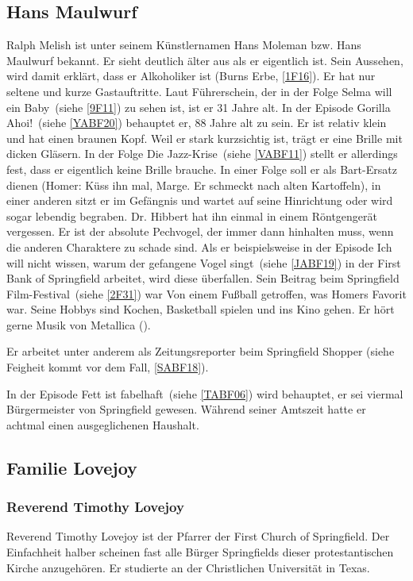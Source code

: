 {\subsection{Hans Maulwurf}\label{HansMaulwurf}
Ralph Melish ist unter seinem Künstlernamen Hans Moleman bzw. Hans Maulwurf bekannt. Er sieht deutlich älter aus als er eigentlich ist. Sein Aussehen, wird damit erklärt, dass er Alkoholiker ist (\glqq Burns Erbe\grqq , \ref{1F16}). Er hat nur seltene und kurze Gastauftritte. Laut Führerschein, der in der Folge \glqq Selma will ein Baby\grqq\ (siehe \ref{9F11}) zu sehen ist, ist er 31 Jahre alt. In der Episode \glqq Gorilla Ahoi!\grqq\ (siehe \ref{YABF20}) behauptet er, 88 Jahre alt zu sein. Er ist relativ klein und hat einen braunen Kopf. Weil er stark kurzsichtig ist, trägt er eine Brille mit dicken Gläsern. In der Folge \glqq Die Jazz-Krise\grqq\ (siehe \ref{VABF11}) stellt er allerdings fest, dass er eigentlich keine Brille brauche. In einer Folge soll er als Bart-Ersatz dienen (Homer: \glqq Küss ihn mal, Marge. Er schmeckt nach alten Kartoffeln\grqq ), in einer anderen sitzt er im Gefängnis und wartet auf seine Hinrichtung oder wird sogar lebendig begraben. Dr. Hibbert hat ihn einmal in einem Röntgengerät vergessen. Er ist der absolute Pechvogel, der immer dann hinhalten muss, wenn die anderen Charaktere zu schade sind. Als er beispielsweise in der Episode \glqq Ich will nicht wissen, warum der gefangene Vogel singt\grqq\ (siehe \ref{JABF19}) in der First Bank of Springfield arbeitet, wird diese überfallen. Sein Beitrag beim \glqq Springfield Film-Festival\grqq\ (siehe \ref{2F31}) war \glqq Von einem Fußball getroffen\grqq , was Homers Favorit war. Seine Hobbys sind Kochen, Basketball spielen und ins Kino gehen. Er hört gerne Musik von Metallica (\cite{ET742}).

Er arbeitet unter anderem als Zeitungsreporter beim Springfield Shopper (siehe \glqq Feigheit kommt vor dem Fall\grqq , \ref{SABF18}).

In der Episode \glqq Fett ist fabelhaft\grqq\ (siehe \ref{TABF06}) wird behauptet, er sei viermal Bürgermeister von Springfield gewesen. Während seiner Amtszeit hatte er achtmal einen ausgeglichenen Haushalt.

\subsection{Familie Lovejoy}

\subsubsection{Reverend Timothy Lovejoy}\label{TimothyLovejoy}
Reverend Timothy Lovejoy ist der Pfarrer der \glqq First Church of Springfield\grqq . Der Einfachheit halber scheinen fast alle Bürger Springfields dieser protestantischen Kirche anzugehören. Er studierte an der Christlichen Universität in Texas.

}
